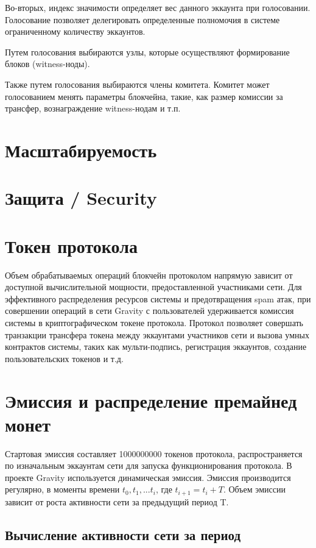 \documentclass[a4paper,12pt]{article}
\begin{document}
Во-вторых, индекс значимости определяет вес данного эккаунта при голосовании. Голосование позволяет делегировать определенные полномочия в системе ограниченному количеству эккаунтов.

Путем голосования выбираются узлы, которые осуществляют формирование блоков (witness-ноды). 

Также путем голосования выбираются члены комитета. Комитет может голосованием менять параметры блокчейна, такие, как размер комиссии за трансфер, вознаграждение witness-нодам и т.п.


\section{Масштабируемость}

\section{Защита / Security}

\section{Токен протокола}
Объем обрабатываемых операций блокчейн протоколом напрямую зависит от доступной вычислительной мощности, предоставленной участниками сети. Для эффективного распределения ресурсов системы и предотвращения spam атак, при совершении операций в сети Gravity с пользователей удерживается комиссия системы в криптографическом токене протокола.
Протокол позволяет совершать транзакции трансфера токена между эккаунтами участников сети и вызова умных контрактов системы, таких как мульти-подпись, регистрация эккаунтов, создание пользовательских токенов и т.д. 

\section{Эмиссия и распределение премайнед монет}

Стартовая эмиссия составляет 1000000000 токенов протокола, распространяется по изначальным эккаунтам сети для запуска функционирования протокола.   
В проекте Gravity используется динамическая эмиссия. Эмиссия производится регулярно, в моменты времени $t_0, t_1, ... t_i$, где $t_{i+1} = t_i + T$. Объем эмиссии зависит от роста активности сети за предыдущий период T.

\subsection{Вычисление активности сети за период}
\end{document}
